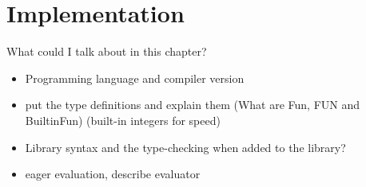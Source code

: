 \chapter{Implementation} \label{implementation}

What could I talk about in this chapter?
\begin{itemize}
\item Programming language and compiler version
\item put the type definitions and explain them (What are Fun, FUN and BuiltinFun) (built-in integers for speed)
\item Library syntax and the type-checking when added to the library?
\item eager evaluation, describe evaluator
\end{itemize}



